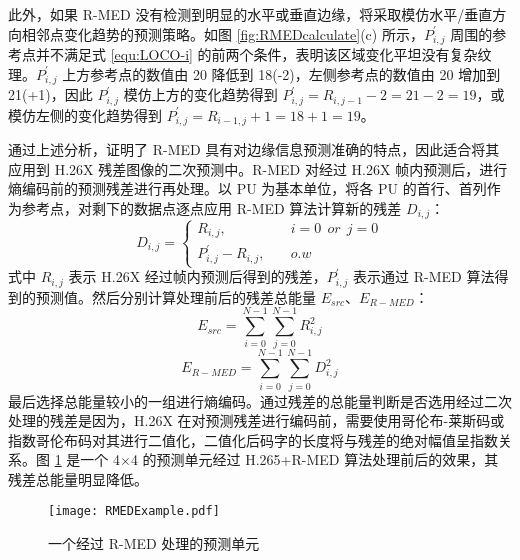 此外，如果 R-MED 没有检测到明显的水平或垂直边缘，将采取模仿水平/垂直方向相邻点变化趋势的预测策略。如图 \ref{fig:RMEDcalculate}(c) 所示，$P_{i,j}^{'}$ 周围的参考点并不满足式 \ref{equ:LOCO-i} 的前两个条件，表明该区域变化平坦没有复杂纹理。$P_{i,j}^{'}$ 上方参考点的数值由 20 降低到 18(-2)，左侧参考点的数值由 20 增加到 21(+1)，因此 $P_{i,j}^{'}$ 模仿上方的变化趋势得到 $P_{i,j}^{'}=R_{i,j-1}-2=21-2=19$，或模仿左侧的变化趋势得到 $P_{i,j}^{'}=R_{i-1,j}+1=18+1=19$。

通过上述分析，证明了 R-MED 具有对边缘信息预测准确的特点，因此适合将其应用到 H.26X 残差图像的二次预测中。R-MED 对经过 H.26X 帧内预测后，进行熵编码前的预测残差进行再处理。以 PU 为基本单位，将各 PU 的首行、首列作为参考点，对剩下的数据点逐点应用 R-MED 算法计算新的残差 $D_{i,j}$：
\begin{equation}
    D_{i,j}=\left\{
    \begin{aligned}
        R_{i,j}, \quad             & i=0 \ \ or \ \ j=0 \\
        P_{i,j}^{'}-R_{i,j}, \quad & o.w
    \end{aligned}
    \right.
\end{equation}
式中 $R_{i,j}$ 表示 H.26X 经过帧内预测后得到的残差，$P_{i,j}^{'}$ 表示通过 R-MED 算法得到的预测值。然后分别计算处理前后的残差总能量 $E_{src}$、$E_{R-MED}$：
\begin{equation}
    E_{src}=\sum_{i=0}^{N-1} \sum_{j=0}^{N-1} R_{i,j}^{2}
\end{equation}
\begin{equation}
    E_{R-MED}=\sum_{i=0}^{N-1} \sum_{j=0}^{N-1} D_{i,j}^{2}
\end{equation}
最后选择总能量较小的一组进行熵编码。通过残差的总能量判断是否选用经过二次处理的残差是因为，H.26X 在对预测残差进行编码前，需要使用哥伦布-莱斯码或指数哥伦布码对其进行二值化，二值化后码字的长度将与残差的绝对幅值呈指数关系。图 \ref{fig:RMEDExample} 是一个 4$\times$4 的预测单元经过 H.265+R-MED 算法处理前后的效果，其残差总能量明显降低。
\begin{figure}[hbt]
    \centering
    \texttt{[image: RMEDExample.pdf]}
    \caption{一个经过 R-MED 处理的预测单元}
    \label{fig:RMEDExample}
\end{figure}

